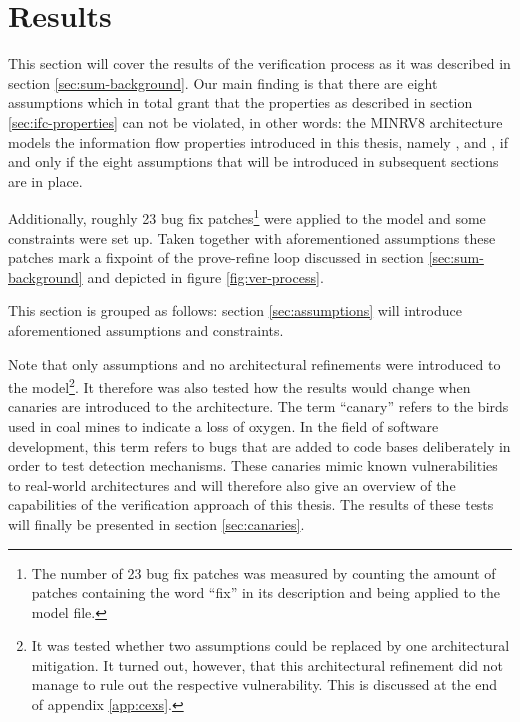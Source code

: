 
\chapter{Results}
\label{chp:results}

This section will cover the results of the verification process as it was described in section \ref{sec:sum-background}.
Our main finding is that there are eight assumptions which in total grant that the properties as described in section \ref{sec:ifc-properties} can not be violated, in other words: the MINRV8 architecture models the information flow properties introduced in this thesis, namely ,  and , if and only if the eight assumptions that will be introduced in subsequent sections are in place.

Additionally, roughly 23 bug fix patches\footnote{%
    The number of 23 bug fix patches was measured by counting the amount of patches containing the word \enquote{fix} in its description and being applied to the model file.
} were applied to the model and some  constraints were set up.
Taken together with aforementioned assumptions these patches mark a fixpoint of the prove-refine loop discussed in section \ref{sec:sum-background} and depicted in figure \ref{fig:ver-process}.

This section is grouped as follows: section \ref{sec:assumptions} will introduce aforementioned assumptions and  constraints.

Note that only assumptions and no architectural refinements were introduced to the model\footnote{%
    It was tested whether two assumptions could be replaced by one architectural mitigation.
    It turned out, however, that this architectural refinement did not manage to rule out the respective vulnerability.
    This is discussed at the end of appendix \ref{app:cexs}.
}.
It therefore was also tested how the results would change when canaries are introduced to the architecture.
The term \enquote{canary} refers to the birds used in coal mines to indicate a loss of oxygen.
In the field of software development, this term refers to bugs that are added to code bases deliberately in order to test detection mechanisms.
These canaries mimic known vulnerabilities to real-world architectures and will therefore also give an overview of the capabilities of the verification approach of this thesis.
The results of these tests will finally be presented in section \ref{sec:canaries}.

